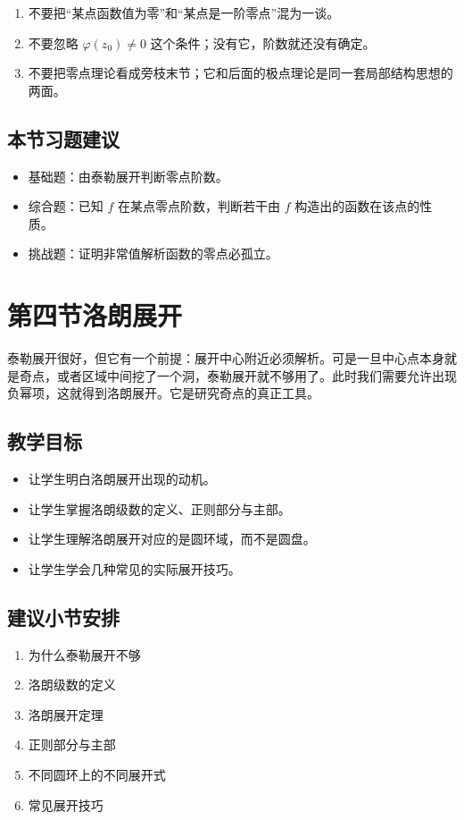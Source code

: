 \begin{jinshi}[本节易错点]
\begin{enumerate}
    \item 不要把``某点函数值为零''和``某点是一阶零点''混为一谈。
    \item 不要忽略 $\varphi(z_0)\neq 0$ 这个条件；没有它，阶数就还没有确定。
    \item 不要把零点理论看成旁枝末节；它和后面的极点理论是同一套局部结构思想的两面。
\end{enumerate}
\end{jinshi}

\subsection*{本节习题建议}
\begin{itemize}
    \item 基础题：由泰勒展开判断零点阶数。
    \item 综合题：已知 $f$ 在某点零点阶数，判断若干由 $f$ 构造出的函数在该点的性质。
    \item 挑战题：证明非常值解析函数的零点必孤立。
\end{itemize}

\section{第四节\quad 洛朗展开}

\begin{wulibj}[本节要解决的问题]
泰勒展开很好，但它有一个前提：展开中心附近必须解析。可是一旦中心点本身就是奇点，或者区域中间挖了一个洞，泰勒展开就不够用了。此时我们需要允许出现负幂项，这就得到洛朗展开。它是研究奇点的真正工具。
\end{wulibj}

\subsection*{教学目标}
\begin{itemize}
    \item 让学生明白洛朗展开出现的动机。
    \item 让学生掌握洛朗级数的定义、正则部分与主部。
    \item 让学生理解洛朗展开对应的是圆环域，而不是圆盘。
    \item 让学生学会几种常见的实际展开技巧。
\end{itemize}

\subsection*{建议小节安排}
\begin{enumerate}
    \item 为什么泰勒展开不够
    \item 洛朗级数的定义
    \item 洛朗展开定理
    \item 正则部分与主部
    \item 不同圆环上的不同展开式
    \item 常见展开技巧
\end{enumerate}

